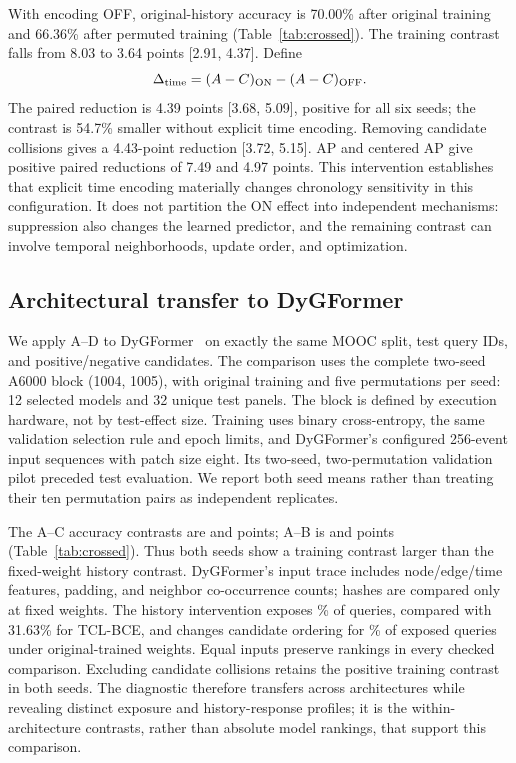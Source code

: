 \documentclass[sigconf,anonymous,review]{acmart}
\begin{document}
With encoding OFF, original-history accuracy is 70.00\% after original training and 66.36\% after permuted training (Table~\ref{tab:crossed}). The training contrast falls from 8.03 to 3.64 points [2.91, 4.37]. Define
\[
\Delta_{\rm time}=(A-C)_{\rm ON}-(A-C)_{\rm OFF}.
\]
The paired reduction is 4.39 points [3.68, 5.09], positive for all six seeds; the contrast is 54.7\% smaller without explicit time encoding. Removing candidate collisions gives a 4.43-point reduction [3.72, 5.15]. AP and centered AP give positive paired reductions of 7.49 and 4.97 points. This intervention establishes that explicit time encoding materially changes chronology sensitivity in this configuration. It does not partition the ON effect into independent mechanisms: suppression also changes the learned predictor, and the remaining contrast can involve temporal neighborhoods, update order, and optimization.

\subsection{Architectural transfer to DyGFormer}
We apply A--D to DyGFormer~\cite{yu2023dygformer} on exactly the same MOOC split, test query IDs, and positive/negative candidates. The comparison uses the complete two-seed A6000 block (1004, 1005), with original training and five permutations per seed: 12 selected models and 32 unique test panels. The block is defined by execution hardware, not by test-effect size. Training uses binary cross-entropy, the same validation selection rule and epoch limits, and DyGFormer's configured 256-event input sequences with patch size eight. Its two-seed, two-permutation validation pilot preceded test evaluation. We report both seed means rather than treating their ten permutation pairs as independent replicates.

The A--C accuracy contrasts are \DyGTrainingSeedOne{} and \DyGTrainingSeedTwo{} points; A--B is \DyGHistorySeedOne{} and \DyGHistorySeedTwo{} points (Table~\ref{tab:crossed}). Thus both seeds show a training contrast larger than the fixed-weight history contrast. DyGFormer's input trace includes node/edge/time features, padding, and neighbor co-occurrence counts; hashes are compared only at fixed weights. The history intervention exposes \DyGExposure{}\% of queries, compared with 31.63\% for TCL-BCE, and changes candidate ordering for \DyGFlip{}\% of exposed queries under original-trained weights. Equal inputs preserve rankings in every checked comparison. Excluding candidate collisions retains the positive training contrast in both seeds. The diagnostic therefore transfers across architectures while revealing distinct exposure and history-response profiles; it is the within-architecture contrasts, rather than absolute model rankings, that support this comparison.
\end{document}
